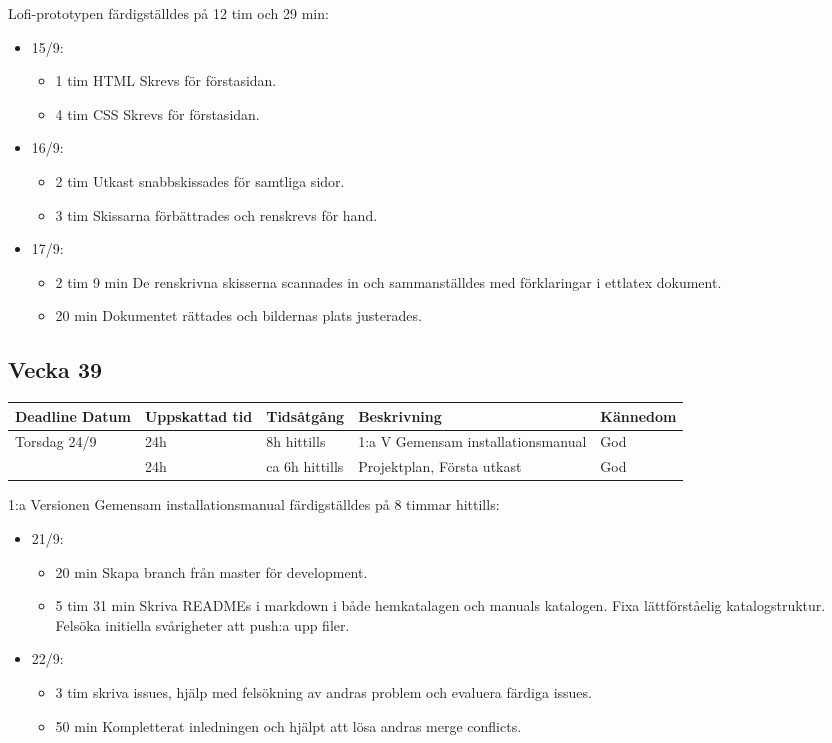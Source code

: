 \documentclass{TDP003mall}
\begin{document}
Lofi-prototypen färdigställdes på 12 tim och 29 min:
\begin{itemize}
	\item 15/9:
	\begin{itemize}
		\item 1 tim HTML Skrevs för förstasidan.
		\item 4 tim CSS Skrevs för förstasidan.
        \end{itemize}
	\item 16/9:
	\begin{itemize}
		\item 2 tim Utkast snabbskissades för samtliga sidor.
		\item 3 tim Skissarna förbättrades och renskrevs för hand.
	\end{itemize}
	\item 17/9:
	\begin{itemize}
		\item 2 tim 9 min De renskrivna skisserna scannades in och sammanställdes med förklaringar i ettlatex dokument.
		\item 20 min Dokumentet rättades och bildernas plats justerades.\\
	\end{itemize}
\end{itemize}


\subsection{Vecka 39}
\begin{tabularx}{\linewidth}{|l|l|l|X|l|}
	\hline
	Deadline Datum & Uppskattad tid & Tidsåtgång     & Beskrivning                        & Kännedom \\ 
	\hline
	Torsdag 24/9   & 24h            & 8h hittills    & 1:a V Gemensam installationsmanual & God      \\
	\hline
                   & 24h            & ca 6h hittills & Projektplan, Första utkast         & God      \\
	\hline
\end{tabularx}

1:a Versionen Gemensam installationsmanual färdigställdes på 8 timmar hittills:
\begin{itemize}
	\item 21/9:
	\begin{itemize}
		\item 20 min Skapa branch från master för development.
		\item 5 tim 31 min Skriva READMEs i markdown i både hemkatalagen och manuals katalogen. Fixa lättförståelig katalogstruktur. Felsöka initiella svårigheter att push:a upp filer.
	\end{itemize}
	\item 22/9:
	\begin{itemize}
        \item 3 tim skriva issues, hjälp med felsökning av andras problem och evaluera färdiga issues.
          \item 50 min Kompletterat inledningen och hjälpt att lösa andras merge conflicts.\\
	\end{itemize}
\end{itemize}
\end{document}

